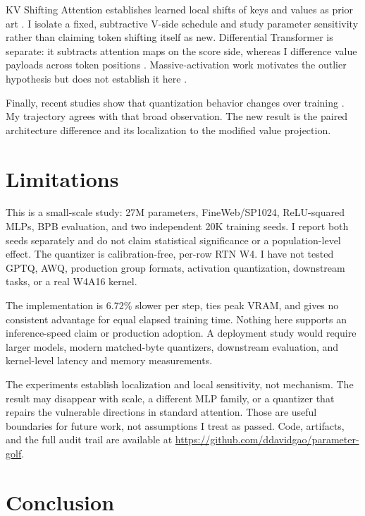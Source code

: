 \documentclass[10pt]{article}
\begin{document}
KV Shifting Attention establishes learned local shifts of keys and values as prior art \citep{xu2024kvshift}. I isolate a fixed, subtractive V-side schedule and study parameter sensitivity rather than claiming token shifting itself as new. Differential Transformer is separate: it subtracts attention maps on the score side, whereas I difference value payloads across token positions \citep{ye2024differential}. Massive-activation work motivates the outlier hypothesis but does not establish it here \citep{sun2024massive}.

Finally, recent studies show that quantization behavior changes over training \citep{ouyang2024undertrained,catalan2025training}. My trajectory agrees with that broad observation. The new result is the paired architecture difference and its localization to the modified value projection.

\section{Limitations}\label{limitations}

This is a small-scale study: 27M parameters, FineWeb/SP1024, ReLU-squared MLPs, BPB evaluation, and two independent 20K training seeds. I report both seeds separately and do not claim statistical significance or a population-level effect. The quantizer is calibration-free, per-row RTN W4. I have not tested GPTQ, AWQ, production group formats, activation quantization, downstream tasks, or a real W4A16 kernel.

The implementation is 6.72\% slower per step, ties peak VRAM, and gives no consistent advantage for equal elapsed training time. Nothing here supports an inference-speed claim or production adoption. A deployment study would require larger models, modern matched-byte quantizers, downstream evaluation, and kernel-level latency and memory measurements.

The experiments establish localization and local sensitivity, not mechanism. The result may disappear with scale, a different MLP family, or a quantizer that repairs the vulnerable directions in standard attention. Those are useful boundaries for future work, not assumptions I treat as passed. Code, artifacts, and the full audit trail are available at \url{https://github.com/ddavidgao/parameter-golf}.

\section{Conclusion}\label{conclusion}
\end{document}
